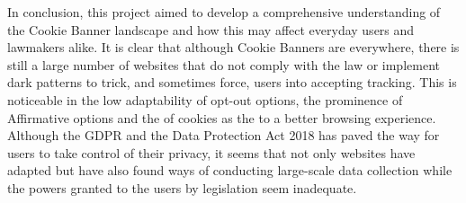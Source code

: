 \documentclass[../main.tex]{subfiles}
\begin{document}
In conclusion, this project aimed to develop a comprehensive understanding of the Cookie Banner landscape and how this may affect everyday users and lawmakers alike. It is clear that although Cookie Banners are everywhere, there is still a large number of websites that do not comply with the law or implement dark patterns to trick, and sometimes force, users into accepting tracking. This is noticeable in the low adaptability of opt-out options, the prominence of Affirmative options and the  of cookies as the  to a better browsing experience. Although the GDPR and the Data Protection Act 2018 has paved the way for users to take control of their privacy, it seems that not only websites have adapted but have also found ways of conducting large-scale data collection while the powers granted to the users by legislation seem inadequate.  
\end{document}
